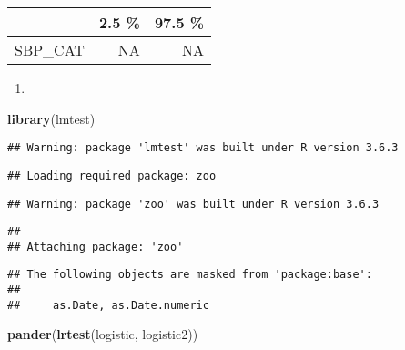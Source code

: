 \documentclass[
]{article}
\newenvironment{Shaded}{\begin{snugshade}}{\end{snugshade}}
\newcommand{\KeywordTok}[1]{\textcolor[rgb]{0.13,0.29,0.53}{\textbf{#1}}}
\newcommand{\NormalTok}[1]{#1}
\begin{document}
\begin{table}[H]
\centering
\begin{tabular}{l|r|r}
\hline
  & 2.5 \% & 97.5 \%\\
\hline
SBP\_CAT & NA & NA\\
\hline
\end{tabular}
\end{table}

\begin{enumerate}
\def\labelenumi{\alph{enumi})}
\setcounter{enumi}{5}
\item
\end{enumerate}

\begin{Shaded}
\begin{Highlighting}[]
\KeywordTok{library}\NormalTok{(lmtest)}
\end{Highlighting}
\end{Shaded}

\begin{verbatim}
## Warning: package 'lmtest' was built under R version 3.6.3
\end{verbatim}

\begin{verbatim}
## Loading required package: zoo
\end{verbatim}

\begin{verbatim}
## Warning: package 'zoo' was built under R version 3.6.3
\end{verbatim}

\begin{verbatim}
## 
## Attaching package: 'zoo'
\end{verbatim}

\begin{verbatim}
## The following objects are masked from 'package:base':
## 
##     as.Date, as.Date.numeric
\end{verbatim}

\begin{Shaded}
\begin{Highlighting}[]
\KeywordTok{pander}\NormalTok{(}\KeywordTok{lrtest}\NormalTok{(logistic, logistic2))}
\end{Highlighting}
\end{Shaded}
\end{document}
